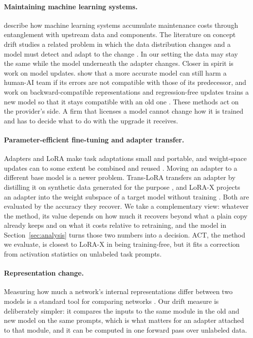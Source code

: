 \documentclass[preprint,12pt,authoryear]{elsarticle}
\begin{document}
\paragraph{Maintaining machine learning systems.} \citet{sculley2015hidden} describe how machine learning systems accumulate maintenance costs through entanglement with upstream data and components. The literature on concept drift studies a related problem in which the data distribution changes and a model must detect and adapt to the change \citep{gama2014survey}. In our setting the data may stay the same while the model underneath the adapter changes. Closer in spirit is work on model updates. \citet{bansal2019updates} show that a more accurate model can still harm a human-AI team if its errors are not compatible with those of its predecessor, and work on backward-compatible representations and regression-free updates trains a new model so that it stays compatible with an old one \citep{shen2020backward,yan2021positive}. These methods act on the provider's side. A firm that licenses a model cannot change how it is trained and has to decide what to do with the upgrade it receives.

\paragraph{Parameter-efficient fine-tuning and adapter transfer.} Adapters \citep{houlsby2019parameter} and LoRA \citep{hu2022lora} make task adaptations small and portable, and weight-space updates can to some extent be combined and reused \citep{ilharco2023editing}. Moving an adapter to a different base model is a newer problem. Trans-LoRA transfers an adapter by distilling it on synthetic data generated for the purpose \citep{wang2024translora}, and LoRA-X projects an adapter into the weight subspace of a target model without training \citep{farhadzadeh2025lorax}. Both are evaluated by the accuracy they recover. We take a complementary view: whatever the method, its value depends on how much it recovers beyond what a plain copy already keeps and on what it costs relative to retraining, and the model in Section~\ref{sec:analysis} turns those two numbers into a decision. ACT, the method we evaluate, is closest to LoRA-X in being training-free, but it fits a correction from activation statistics on unlabeled task prompts.

\paragraph{Representation change.} Measuring how much a network's internal representations differ between two models is a standard tool for comparing networks \citep{kornblith2019similarity}. Our drift measure is deliberately simpler: it compares the inputs to the same module in the old and new model on the same prompts, which is what matters for an adapter attached to that module, and it can be computed in one forward pass over unlabeled data.
\end{document}
